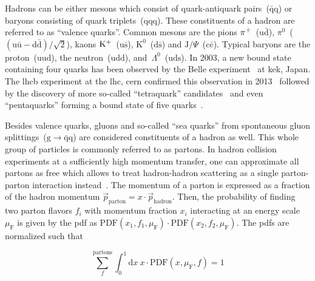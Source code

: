 Hadrons can be either mesons which consist of quark-antiquark pairs~($\bar{\mathrm{q}}\mathrm{q}$) or baryons consisting of quark triplets~($\mathrm{qqq}$). These constituents of a hadron are referred to as ``valence quarks''. Common mesons are the pions $\pi^{+}$~($\mathrm{u}\bar{\mathrm{d}}$), $\pi^{0}$~($(\mathrm{u}\bar{\mathrm{u}}-\mathrm{d}\bar{\mathrm{d}})/\sqrt{2}$), kaons $\mathrm{K}^{+}$~($\mathrm{u}\bar{\mathrm{s}}$), $\mathrm{K}^{0}$~($\mathrm{d}\bar{\mathrm{s}}$) and $\mathrm{J}/\Psi$~($\mathrm{c}\bar{\mathrm{c}}$). Typical baryons are the proton~($\mathrm{uud}$), the neutron~($\mathrm{udd}$), and~$\Lambda^{0}$~($\mathrm{uds}$). In 2003, a new bound state containing four quarks has been observed by the Belle experiment~\cite{PhysRevLett.91.262001} at \gls{kek}, Japan. The \gls{lhcb} experiment at the \gls{lhc}, \gls{cern} confirmed this observation in 2013~\cite{Aaij:2013zoa} followed by the discovery of more so-called ``tetraquark'' candidates~\cite{Aaij:2014jqa,Aaij:2016iza} and even ``pentaquarks'' forming a bound state of five quarks~\cite{Aaij:2015tga}.

Besides valence quarks, gluons and so-called ``sea quarks'' from spontaneous gluon splittings~($\mathrm{g}\to\bar{\mathrm{q}}\mathrm{q}$) are considered constituents of a hadron as well. This whole group of particles is commonly referred to as partons. In hadron collision experiments at a sufficiently high momentum transfer, one can approximate all partons as free which allows to treat hadron-hadron scattering as a single parton-parton interaction instead~\cite{Feynman:1969wa}. The momentum of a parton is expressed as a fraction of the hadron momentum $\vec{p}_\mathrm{parton}=x\cdot \vec{p}_\mathrm{hadron}$. Then, the probability of 
finding two parton flavors $f_{i}$ with momentum fraction $x_{i}$ interacting at an energy scale $\mu_\mathrm{F}$ is given by the \gls{pdf} as $\mathrm{PDF}(x_{1},f_{1},\mu_\mathrm{F})\cdot\mathrm{PDF}(x_{2},f_{2},\mu_\mathrm{F})$. The \glspl{pdf} are normalized such that

\begin{equation}
\sum_{f}^\mathrm{partons}\int_{0}^{1}\mathrm{d}x~x\cdot \mathrm{PDF}(x,\mu_\mathrm{F},f)=1
\end{equation}

